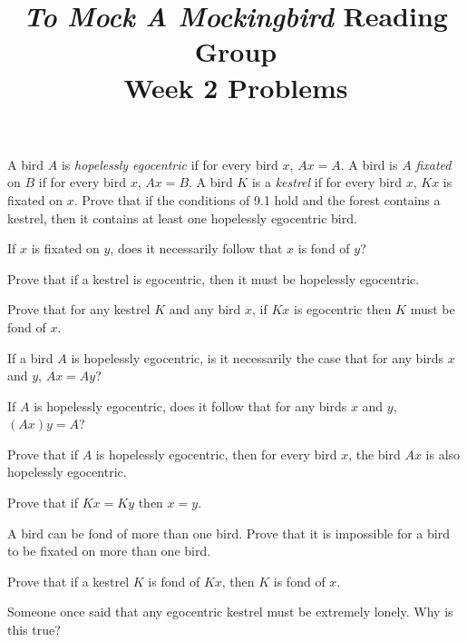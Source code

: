 \documentclass[12pt, letterpaper]{article}
\title{\emph{To Mock A Mockingbird} Reading Group\\Week 2 Problems}
\begin{document}
\maketitle

\disclaimer

\begin{prob}{9.9}
A bird $A$ is \emph{hopelessly egocentric} if for every bird $x$, $Ax = A$. A bird is $A$ \emph{fixated} on $B$ if for every bird $x$, $Ax = B$. A bird $K$ is a \emph{kestrel} if for every bird $x$, $Kx$ is fixated on $x$. Prove that if the conditions of 9.1 hold and the forest contains a kestrel, then it contains at least one hopelessly egocentric bird.
\end{prob}

\begin{prob}{9.10}
If $x$ is fixated on $y$, does it necessarily follow that $x$ is fond of $y$?
\end{prob}

\begin{prob}{9.11}
Prove that if a kestrel is egocentric, then it must be hopelessly egocentric.
\end{prob}

\begin{prob}{9.12}
Prove that for any kestrel $K$ and any bird $x$, if $Kx$ is egocentric then $K$ must be fond of $x$.
\end{prob}

\begin{prob}{9.13}
If a bird $A$ is hopelessly egocentric, is it necessarily the case that for any birds $x$ and $y$, $Ax = Ay$?
\end{prob}

\begin{prob}{9.14}
If $A$ is hopelessly egocentric, does it follow that for any birds $x$ and $y$, $(Ax)y = A$?
\end{prob}

\begin{prob}{9.15}
Prove that if $A$ is hopelessly egocentric, then for every bird $x$, the bird $Ax$ is also hopelessly egocentric.
\end{prob}

\begin{prob}{9.16}
Prove that if $Kx = Ky$ then $x = y$.
\end{prob}

\begin{prob}{9.17}
A bird can be fond of more than one bird. Prove that it is impossible for a bird to be fixated on more than one bird.
\end{prob}

\begin{prob}{9.18}
Prove that if a kestrel $K$ is fond of $Kx$, then $K$ is fond of $x$.
\end{prob}

\begin{prob}{9.19}
Someone once said that any egocentric kestrel must be extremely lonely. Why is this true?
\end{prob}
\end{document}
